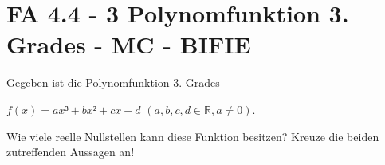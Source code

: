 \section{FA 4.4 - 3 Polynomfunktion 3. Grades - MC - BIFIE}

\begin{beispiel}[FA 4.4]{1} %
				Gegeben ist die Polynomfunktion 3. Grades \begin{center}
	$f(x)=ax³+bx²+cx+d$ $(a,b,c,d\in\mathbb{R},a\neq0)$.\end{center}
	
Wie viele reelle Nullstellen kann diese Funktion besitzen? Kreuze die beiden zutreffenden Aussagen an!

\end{beispiel}
